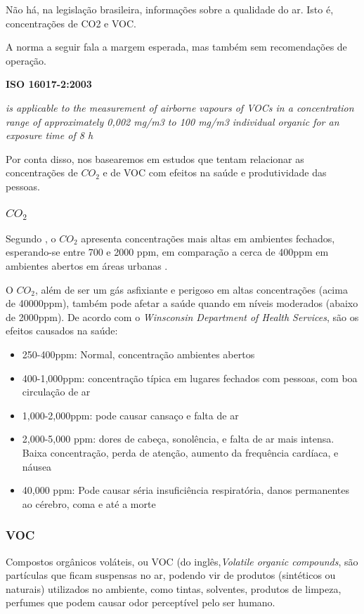 \documentclass[../monografia.tex]{subfiles}
\begin{document}
Não há, na legislação brasileira, informações sobre a qualidade do ar. Isto é, concentrações de CO2 e VOC. 

A norma a seguir fala a margem esperada, mas também sem recomendações de operação. 

\begin{citacaoLonga} %
\textbf{ISO 16017-2:2003}

\textit{is applicable to the measurement of airborne vapours of VOCs in a concentration range of approximately 0,002 mg/m3 to 100 mg/m3 individual organic for an exposure time of 8 h}
\end{citacaoLonga}

Por conta disso, nos basearemos em estudos que tentam relacionar as concentrações de $CO_{2}$  e de VOC com efeitos na saúde e produtividade das pessoas. 

\subsubsection{$CO_{2}$}
Segundo \cite{AirQuality}, o $CO_{2}$ apresenta concentrações mais altas em ambientes fechados, esperando-se entre 700 e 2000 ppm, em comparação a cerca de 400ppm em ambientes abertos em áreas urbanas \cite{co2Earth}. 

O $CO_{2}$, além de ser um gás asfixiante e perigoso em altas concentrações (acima de 40000ppm), também pode afetar a saúde quando em níveis moderados (abaixo de 2000ppm). 
De acordo com o \textit{Winsconsin Department of Health Services}\cite{Winsconsin}, são os efeitos causados na saúde: 
\begin{itemize}
\item 250-400ppm: Normal, concentração ambientes abertos
\item 400-1,000ppm: concentração típica em lugares fechados com pessoas, com boa circulação de ar
\item 1,000-2,000ppm: pode causar cansaço e falta de ar
\item 2,000-5,000 ppm: dores de cabeça, sonolência, e falta de ar mais intensa. Baixa concentração, perda de atenção, aumento da frequência cardíaca, e náusea
\item 40,000 ppm: Pode causar séria insuficiência respiratória, danos permanentes ao cérebro, coma e até a morte
\end{itemize}

\subsubsection{VOC}
Compostos orgânicos voláteis, ou VOC (do inglês,\textit{Volatile organic compounds}, são partículas que ficam suspensas no ar, podendo vir de produtos (sintéticos ou naturais) utilizados no ambiente, como tintas, solventes, produtos de limpeza, perfumes que podem causar odor perceptível pelo ser humano\cite{AirQuality}.
\end{document}
